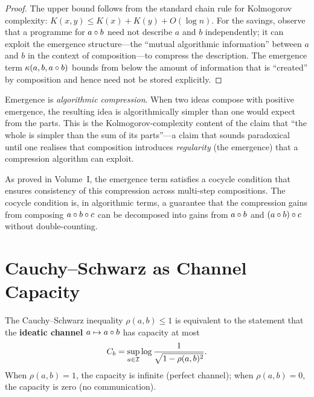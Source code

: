 \begin{proof}
The upper bound follows from the standard chain rule for Kolmogorov
complexity: $K(x,y) \le K(x) + K(y) + O(\log n)$.  For the savings,
observe that a programme for $a \circ b$ need not describe $a$ and
$b$ independently; it can exploit the emergence structure---the
``mutual algorithmic information'' between $a$ and $b$ in the context
of composition---to compress the description.  The emergence term
$\kappa(a,b,a \circ b)$ bounds from below the amount of
information that is ``created'' by composition and hence need not
be stored explicitly.
\end{proof}

\begin{interpretation}
Emergence is \emph{algorithmic compression}.  When two ideas compose
with positive emergence, the resulting idea is algorithmically
simpler than one would expect from the parts.  This is the
Kolmogorov-complexity content of the claim that ``the whole is
simpler than the sum of its parts''---a claim that sounds paradoxical
until one realises that composition introduces \emph{regularity}
(the emergence) that a compression algorithm can exploit.

As proved in Volume~I, the emergence term satisfies a cocycle
condition that ensures consistency of this compression across
multi-step compositions.  The cocycle condition is, in algorithmic
terms, a guarantee that the compression gains from composing
$a \circ b \circ c$ can be decomposed into gains from
$a \circ b$ and $(a \circ b) \circ c$ without double-counting.
\end{interpretation}

\section{Cauchy--Schwarz as Channel Capacity}
\label{sec:channel-capacity}

\begin{theorem}
\label{thm:channel-capacity}
The Cauchy--Schwarz inequality $\rho(a,b) \le 1$ is equivalent
to the statement that the \textbf{ideatic channel} $a \mapsto
a \circ b$ has capacity at most
\[
  C_b = \sup_{a \in \mathcal{I}} \log \frac{1}{\sqrt{1-\rho(a,b)^2}}.
\]
When $\rho(a,b)=1$, the capacity is infinite (perfect channel);
when $\rho(a,b)=0$, the capacity is zero (no communication).
\end{theorem}

